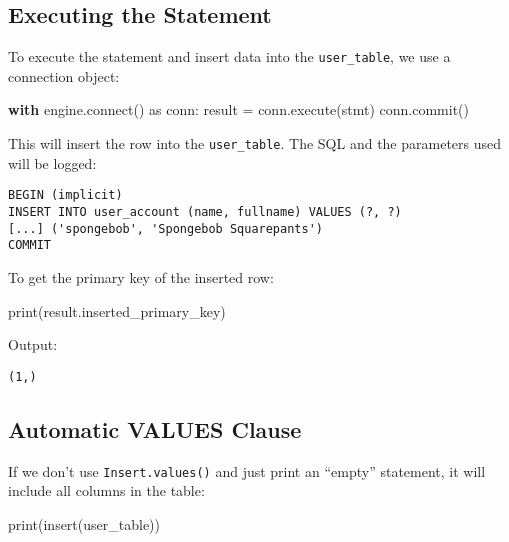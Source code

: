 \documentclass[
  letterpaper,
  DIV=11,
  numbers=noendperiod]{scrreprt}
\newenvironment{Shaded}{\begin{snugshade}}{\end{snugshade}}
\newcommand{\BuiltInTok}[1]{\textcolor[rgb]{0.00,0.23,0.31}{#1}}
\newcommand{\ControlFlowTok}[1]{\textcolor[rgb]{0.00,0.23,0.31}{\textbf{#1}}}
\newcommand{\ExtensionTok}[1]{\textcolor[rgb]{0.00,0.23,0.31}{#1}}
\newcommand{\ImportTok}[1]{\textcolor[rgb]{0.00,0.46,0.62}{#1}}
\newcommand{\NormalTok}[1]{\textcolor[rgb]{0.00,0.23,0.31}{#1}}
\newcommand{\OperatorTok}[1]{\textcolor[rgb]{0.37,0.37,0.37}{#1}}
\begin{document}
\subsection{Executing the Statement}\label{executing-the-statement}

To execute the statement and insert data into the \texttt{user\_table},
we use a connection object:

\begin{Shaded}
\begin{Highlighting}[]
\ControlFlowTok{with}\NormalTok{ engine.}\ExtensionTok{connect}\NormalTok{() }\ImportTok{as}\NormalTok{ conn:}
\NormalTok{    result }\OperatorTok{=}\NormalTok{ conn.execute(stmt)}
\NormalTok{    conn.commit()}
\end{Highlighting}
\end{Shaded}

This will insert the row into the \texttt{user\_table}. The SQL and the
parameters used will be logged:

\begin{verbatim}
BEGIN (implicit)
INSERT INTO user_account (name, fullname) VALUES (?, ?)
[...] ('spongebob', 'Spongebob Squarepants')
COMMIT
\end{verbatim}

To get the primary key of the inserted row:

\begin{Shaded}
\begin{Highlighting}[]
\BuiltInTok{print}\NormalTok{(result.inserted\_primary\_key)}
\end{Highlighting}
\end{Shaded}

Output:

\begin{verbatim}
(1,)
\end{verbatim}

\subsection{Automatic VALUES Clause}\label{automatic-values-clause}

If we don't use \texttt{Insert.values()} and just print an ``empty''
statement, it will include all columns in the table:

\begin{Shaded}
\begin{Highlighting}[]
\BuiltInTok{print}\NormalTok{(insert(user\_table))}
\end{Highlighting}
\end{Shaded}
\end{document}
